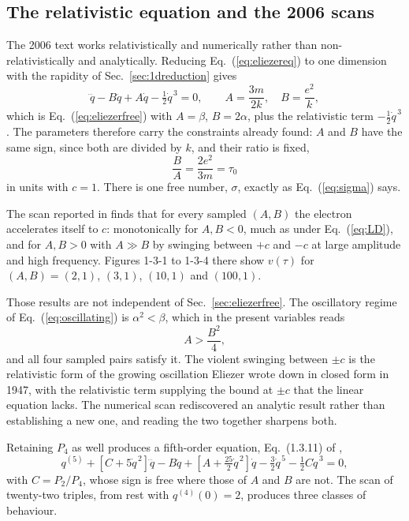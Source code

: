 \documentclass[preprint]{aastex701}
\newcommand{\taunought}{\tau_0}
\begin{document}
\subsection{The relativistic equation and the 2006 scans}
\label{sec:eliezerscan}

The 2006 text works relativistically and numerically rather than
non-relativistically and analytically. Reducing Eq.~(\ref{eq:eliezereq}) to one
dimension with the rapidity of Sec.~\ref{sec:1dreduction} gives
\begin{equation}
\dddot q - B\ddot q + A\dot q - \tfrac12 \dot q^{\,3} = 0,
\qquad
A = \frac{3m}{2k}, \quad B = \frac{e^2}{k},
\label{eq:third}
\end{equation}
which is Eq.~(\ref{eq:eliezerfree}) with $A=\beta$, $B=2\alpha$, plus the
relativistic term $-\tfrac12\dot q^{\,3}$. The parameters therefore carry the
constraints already found: $A$ and $B$ have the same sign, since both are
divided by $k$, and their ratio is fixed,
\begin{equation}
\frac{B}{A} = \frac{2e^2}{3m} = \taunought
\label{eq:BoverA}
\end{equation}
in units with $c=1$. There is one free number, $\sigma$, exactly as
Eq.~(\ref{eq:sigma}) says.

The scan reported in \citet{zhang2006} finds that for every sampled $(A,B)$ the
electron accelerates itself to $c$: monotonically for $A,B<0$, much as under
Eq.~(\ref{eq:LD}), and for $A,B>0$ with $A\gg B$ by swinging between $+c$ and
$-c$ at large amplitude and high frequency. Figures 1-3-1 to 1-3-4 there show
$v(\tau)$ for $(A,B)=(2,1)$, $(3,1)$, $(10,1)$ and $(100,1)$.

Those results are not independent of Sec.~\ref{sec:eliezerfree}. The oscillatory
regime of Eq.~(\ref{eq:oscillating}) is $\alpha^2<\beta$, which in the present
variables reads
\begin{equation}
A > \frac{B^2}{4},
\label{eq:osccondition}
\end{equation}
and all four sampled pairs satisfy it. The violent swinging between $\pm c$ is
the relativistic form of the growing oscillation Eliezer wrote down in closed
form in 1947, with the relativistic term supplying the bound at $\pm c$ that the
linear equation lacks. The numerical scan rediscovered an analytic result rather
than establishing a new one, and reading the two together sharpens both.

Retaining $P_4$ as well produces a fifth-order equation, Eq.~(1.3.11) of
\citet{zhang2006},
\begin{equation}
q^{(5)} + \left[C + 5\dot q^{\,2}\right]\dddot q
 - B\ddot q
 + \left[A + \tfrac{25}{2}\dot q^{\,2}\right]\dot q
 - \tfrac32 \dot q^{\,5}
 - \tfrac12 C \dot q^{\,3} = 0 ,
\label{eq:fifth}
\end{equation}
with $C=P_2/P_4$, whose sign is free where those of $A$ and $B$ are not. The
scan of twenty-two triples, from rest with $q^{(4)}(0)=2$, produces three
classes of behaviour.
\end{document}
